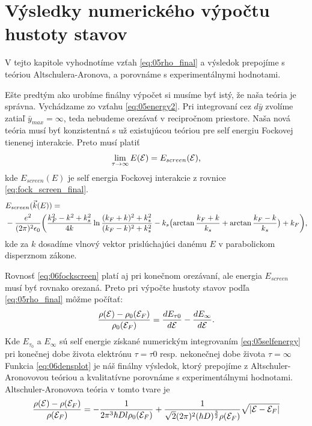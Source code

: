 \section{Výsledky numerického výpočtu hustoty stavov}
V tejto kapitole vyhodnotíme vzťah \eqref{eq:05rho_final} a výsledok prepojíme s teóriou Altschulera-Aronova, a porovnáme s experimentálnymi hodnotami. 

Ešte predtým ako urobíme finálny výpočet si musíme byť istý, že naša teória je správna. Vychádzame zo vzťahu \eqref{eq:05energy2}. Pri integrovaní cez $d\bar{y}$ zvolíme zatiaľ $\bar{y}_{max}=\infty$, teda nebudeme orezávať v recipročnom priestore. Naša nová teória musí byť konzistentná s už existujúcou teóriou pre self energiu Fockovej tienenej interakcie. Preto musí platiť
\begin{align}
\label{eq:06consistency}
\lim_{\tau\to\infty}E(\mathcal{E}) = E_{screen}(\mathcal{E}) \text{,}
\end{align}
kde $E_{screen}(E)$ je self energia Fockovej interakcie z rovnice \eqref{eq:fock_screen_final}.
 \begin{align}
  \label{eq:06fockscreen}
  &E_{screen}(\vec{k}(E))= \\ \notag
  &-\frac{e^2}{(2\pi)^2\epsilon_0} \biggl(
    \frac{k_F^2-k^2+k_s^2}{4k} \ln{\frac{(k_F+k)^2+k_s^2}{(k_F-k)^2+k_s^2}}-k_s\bigl(\arctan{\frac{k_F+k}{k_s}}+\arctan{\frac{k_F-k}{k_s}}\bigr)+k_F\biggr) \text{,}
 \end{align}
 kde za $k$ dosadíme vlnový vektor prislúchajúci danému $E$ v parabolickom disperznom zákone.
 
 Rovnosť \eqref{eq:06fockscreen} platí aj pri konečnom orezávaní, ale energia $E_{screen}$ musí byť rovnako orezaná. Preto pri výpočte hustoty stavov podľa 
 \eqref{eq:05rho_final} môžme počítať:                                      
 \begin{align}
 \label{eq:06densplot}
\frac{\rho(\mathcal{E})-\rho_0(\mathcal{E}_F)}{\rho_0(\mathcal{E}_F)}=\frac{dE_{\tau0}}{d\mathcal{E}}-\frac{dE_{\infty}}{d\mathcal{E}} \text{.}
 \end{align}
Kde $E_{\tau_0}$ a $E_{\infty}$ sú self energie získané numerickým integrovaním \eqref{eq:05selfenergy} pri konečnej dobe života elektrónu $\tau=\tau0$ resp. nekonečnej dobe života $\tau=\infty$
Funkcia \eqref{eq:06densplot} je náš finálny výsledok, ktorý prepojíme z Altschuler-Aronovovou teóriou a kvalitatívne porovnáme s experimentálnymi hodnotami. 
Altschuler-Aronovova teória v tomto tvare je 
\begin{align}
\label{eq:06altschuler}
\frac{\rho(\mathcal{E})-\rho(\mathcal{E}_F)}{\rho(\mathcal{E}_F)}= -\frac{1}{2\pi^3\hbar D l \rho_0(\mathcal{E}_F)}+\frac{1}{\sqrt{2}(2\pi)^2(\hbar D)^\frac{3}{2}\rho(\mathcal{E}_F)}\sqrt{|\mathcal{E}-\mathcal{E}_F|}
\end{align}

